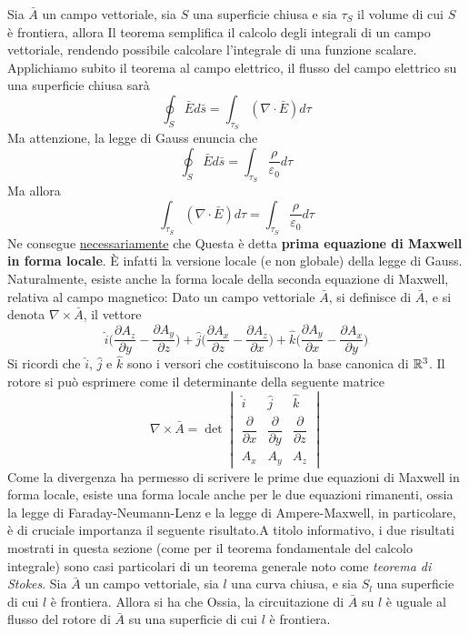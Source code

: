 \documentclass[10pt, letterpaper]{report}
\begin{document}
 Sia $\bar A$ un campo vettoriale, sia $S$ una superficie chiusa e sia $\tau_S$ il volume di cui $S$ è frontiera, allora
Il teorema semplifica il calcolo degli integrali di un campo vettoriale, rendendo possibile calcolare l'integrale di una funzione scalare. Applichiamo subito il teorema al campo elettrico, il flusso del campo elettrico su una superficie chiusa sarà 
$$\oint_S \bar E d\bar s =\int_{\tau_S}(\nabla \cdot \bar E)d\tau $$
Ma attenzione, la legge di Gauss enuncia che 
$$\oint_S \bar E d\bar s =\int_{\tau_S}\frac{\rho}{\varepsilon_0}d\tau $$
Ma allora 
$$\int_{\tau_S}(\nabla \cdot \bar E)d\tau=\int_{\tau_S}\frac{\rho}{\varepsilon_0}d\tau $$
Ne consegue \underline{necessariamente} che 
Questa è detta \textbf{prima equazione di Maxwell in forma locale}. È infatti la versione locale (e non globale) della legge di Gauss. Naturalmente, esiste anche la forma locale della seconda equazione di Maxwell, relativa al campo magnetico:
 Dato un campo vettoriale $\bar A$, si definisce  di $\bar A$, e si denota $\nabla \times \bar A $, il vettore 
$$\hat i\Big(\frac{\partial A_z}{\partial y}-\frac{\partial A_y}{\partial z}\Big)+
\hat j\Big(\frac{\partial A_x}{\partial z}-\frac{\partial A_z}{\partial x}\Big)+
\hat k\Big(\frac{\partial A_y}{\partial x}-\frac{\partial A_x}{\partial y}\Big) $$
Si ricordi che $\hat i$, $\hat j$ e $\hat k$ sono i versori che costituiscono la base canonica di ${\mathbb R}^3$. Il rotore si può esprimere come il determinante della seguente matrice 
$$\nabla \times \bar A=\det\begin{vmatrix}
    \hat i & \hat j & \hat k \\ 
    \dfrac{\partial}{\partial x} &  \dfrac{\partial}{\partial y} &  \dfrac{\partial}{\partial z} \\ 
    A_x & A_y & A_z
\end{vmatrix} $$
Come la divergenza ha permesso di scrivere le prime due equazioni di Maxwell in forma locale, esiste una forma locale anche per le due equazioni rimanenti, ossia la legge di Faraday-Neumann-Lenz e la legge di Ampere-Maxwell, in particolare, è di cruciale importanza il seguente risultato.\acc  A titolo informativo, i due risultati mostrati in questa sezione (come per il teorema fondamentale del calcolo integrale) sono casi particolari di un teorema generale noto come \textit{teorema di Stokes}.\acc
{} Sia $\bar A$ un campo vettoriale, sia $l$ una curva chiusa, e sia $ S_l$ una superficie di cui $l$ è frontiera. Allora si ha che 
Ossia, la circuitazione di $\bar A$ su $l$ è uguale al flusso del rotore di $\bar A$ su una superficie di cui $l$ è frontiera. 
\end{document}
